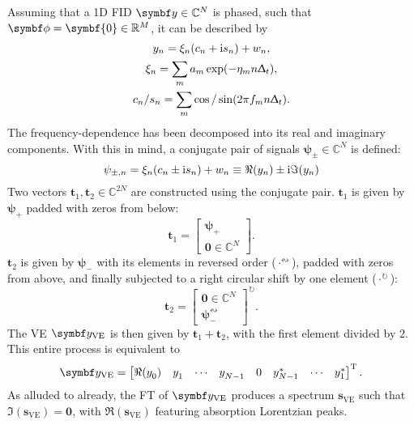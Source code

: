 Assuming that a \ac{1D} \ac{FID} $\by \in \mathbb{C}^N$ is phased, such that
$\bdphi = \symbf{0} \in \mathbb{R}^M$, it can be described by
\begin{subequations}
    \begin{gather}
        y_n = \xi_n (c_n + \mathrm{i} s_n) + w_n,\\
        \xi_n = \sum_m a_m \exp(-\eta_m n \Updelta_t),\\
        c_n / s_n = \sum_m \cos / \sin(2 \pi f_m n \Updelta_t).
    \end{gather}
\end{subequations}
The frequency-dependence has been decomposed into its real and imaginary
components. With this in mind, a conjugate pair of signals $\symbf{\psi}_{\pm}
\in \mathbb{C}^N$ is defined:
\begin{equation}
    \psi_{\pm,n} = \xi_n (c_n \pm \mathrm{i} s_n) + w_n \equiv \Re(y_n) \pm \mathrm{i} \Im(y_n)
\end{equation}
Two vectors $\symbf{t}_{1}, \symbf{t}_2 \in \mathbb{C}^{2N}$
are constructed using the conjugate pair.
$\symbf{t}_1$ is given by $\symbf{\psi}_+$ padded with zeros from below:
    \begin{equation}
        \symbf{t}_1 = \begin{bmatrix}
            \symbf{\psi}_+ \\ \symbf{0} \in \mathbb{C}^{N}
        \end{bmatrix}.
    \end{equation}
$\symbf{t}_2$ is given by $\symbf{\psi}_{-}$ with its elements in
    reversed order ($\cdot^{{\leftrightsquigarrow}}$), padded with zeros
    from above, and finally subjected to a right circular shift by one
    element ($\cdot^{{\circlearrowright}}$):
    \begin{equation}
        \symbf{t}_2 = \begin{bmatrix}
            \symbf{0} \in \mathbb{C}^{N} \\ \symbf{\psi}_-^{{\leftrightsquigarrow}}
    \end{bmatrix}^{{\circlearrowright}}.
   \end{equation}
The \ac{VE} $\by_{\text{VE}}$ is then given by $\symbf{t}_1 +
\symbf{t}_2$, with the first element divided by $2$. This entire process is
equivalent to
\begin{equation}
    \by_{\text{VE}} =
    \begin{bmatrix}
        \Re(y_0^{\vphantom{*}}) &
        y_1^{\vphantom{*}} &
        \cdots &
        y_{N-1}^{\vphantom{*}} &
        0 &
        y_{N-1}^* &
        \cdots &
        y_1^*
    \end{bmatrix}\T.
\end{equation}
As alluded to already, the \ac{FT} of $\by_{\text{VE}}$ produces a spectrum
$\symbf{s}_{\text{VE}}$ such that $\Im\left(\symbf{s}_{\text{VE}}\right) =
\symbf{0}$, with $\Re\left(\symbf{s}_{\text{VE}}\right)$ featuring absorption
Lorentzian peaks.

